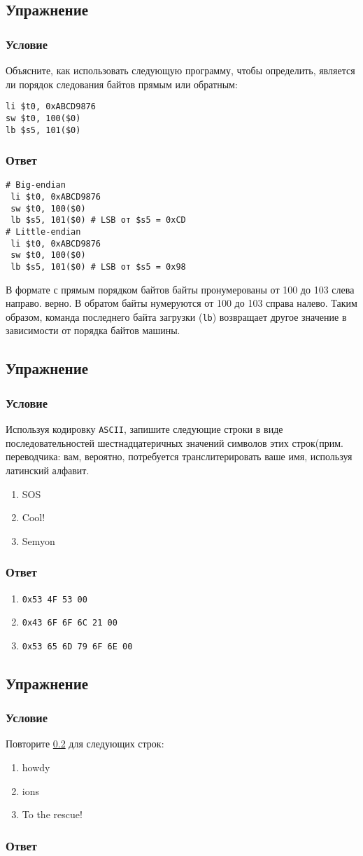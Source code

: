 \documentclass[12pt]{article}
\newenvironment{e}[1][dummy label]{
    \subsection{Упражнение}\label{#1}
    \subsubsection*{Условие}
    }{
    \subsubsection*{Ответ}
}
\newcommand{\eref}[1]{\hyperref[{e:#1}]{\nameref*{e:#1} \ref*{e:#1}}}
\begin{document}
    \newpage

    \begin{e}
        Объясните, как использовать следующую программу, чтобы определить, является ли порядок следования байтов прямым или обратным:

        \begin{verbatim}
li $t0, 0xABCD9876
sw $t0, 100($0)
lb $s5, 101($0)
        \end{verbatim}

    \end{e}

    \begin{verbatim}
# Big-endian
 li $t0, 0xABCD9876
 sw $t0, 100($0)
 lb $s5, 101($0) # LSB от $s5 = 0xCD
# Little-endian
 li $t0, 0xABCD9876
 sw $t0, 100($0)
 lb $s5, 101($0) # LSB от $s5 = 0x98
    \end{verbatim}

    В формате с прямым порядком байтов байты пронумерованы от 100 до 103 слева направо. верно. В обратом байты нумеруются от 100 до 103 справа налево. Таким образом, команда последнего байта загрузки (\texttt{lb}) возвращает другое значение в зависимости от порядка байтов машины.

    \begin{e}[e:ascii]
        Используя кодировку \texttt{ASCII}, запишите следующие строки в виде последовательностей шестнадцатеричных значений символов этих строк(прим. переводчика: вам, вероятно, потребуется транслитерировать ваше имя, используя латинский алфавит.
        \begin{enumerate}
            \item SOS
            \item Cool!
            \item Semyon
        \end{enumerate}
    \end{e}

    \begin{enumerate}
        \item \texttt{0x53 4F 53 00}
        \item \texttt{0x43 6F 6F 6C 21 00}
        \item \texttt{0x53 65 6D 79 6F 6E 00}
    \end{enumerate}

    \begin{e}[e:ascii2]
        Повторите \eref{ascii} для следующих строк:
        \begin{enumerate}
            \item howdy
            \item ions
            \item To the rescue!
        \end{enumerate}
    \end{e}
\end{document}
